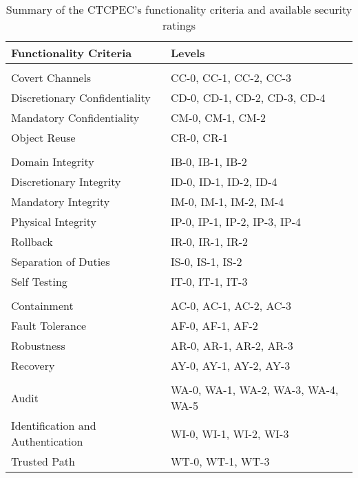     \begin{table}[H]
    \begin{center}
    \begin{tabular}{|>{\sffamily}p{5cm}|>{\sffamily}p{6cm}|} \hline
            \bfseries{Functionality Criteria} & \bfseries{Levels} \\ \hline\hline
            \multicolumn{2}{|l|}{\bfseries{\sffamily{Confidentiality Criteria}}} \\ \hline
            Covert Channels                 & CC-0, CC-1, CC-2, CC-3 \\ \hline
            Discretionary Confidentiality   & CD-0, CD-1, CD-2, CD-3, CD-4 \\ \hline
            Mandatory Confidentiality       & CM-0, CM-1, CM-2 \\ \hline
            Object Reuse                    & CR-0, CR-1 \\ \hline\hline

            \multicolumn{2}{|l|}{\bfseries{\sffamily{Integrity Criteria}}}   \\ \hline           
            Domain Integrity        & IB-0, IB-1, IB-2 \\ \hline
            Discretionary Integrity & ID-0, ID-1, ID-2, ID-4 \\ \hline
            Mandatory Integrity     & IM-0, IM-1, IM-2, IM-4 \\ \hline
            Physical Integrity      & IP-0, IP-1, IP-2, IP-3, IP-4 \\ \hline
            Rollback                & IR-0, IR-1, IR-2 \\ \hline
            Separation of Duties    & IS-0, IS-1, IS-2 \\ \hline
            Self Testing            & IT-0, IT-1, IT-3 \\ \hline\hline

            \multicolumn{2}{|l|}{\bfseries{\sffamily{Availability Criteria}}}   \\ \hline 
            Containment         & AC-0, AC-1, AC-2, AC-3 \\ \hline
            Fault Tolerance     & AF-0, AF-1, AF-2 \\ \hline
            Robustness          & AR-0, AR-1, AR-2, AR-3 \\ \hline
            Recovery            & AY-0, AY-1, AY-2, AY-3 \\ \hline\hline

            \multicolumn{2}{|l|}{\bfseries{\sffamily{Accountability Criteria}}}   \\ \hline
            Audit   &   WA-0, WA-1, WA-2, WA-3, WA-4, WA-5 \\ \hline
            Identification and Authentication   & WI-0, WI-1, WI-2, WI-3 \\ \hline
            Trusted Path    & WT-0, WT-1, WT-3 \\ \hline
    \end{tabular}
    \end{center}
    \caption{Summary of the CTCPEC's functionality criteria and
             available security ratings} \label{table:ctcpec-functionality}
    \end{table}

